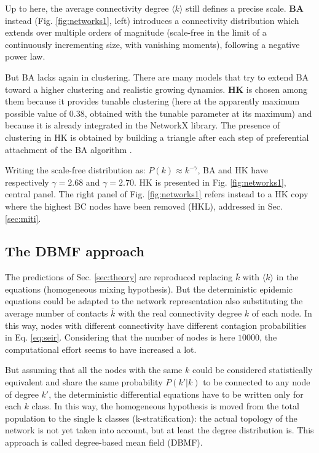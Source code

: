 \documentclass[DIV=12, BCOR=0pt]{scrartcl}  %
\begin{document}
  
  Up to here, the average connectivity degree $\langle k \rangle$ still defines a precise scale. \textbf{BA} instead (Fig. \ref{fig:networks1}, left) introduces a connectivity distribution which extends over multiple orders of magnitude (scale-free in the limit of a continuously incrementing size, with vanishing moments), following a negative power law.
  
  But BA lacks again in clustering. There are many models that try to extend BA toward a higher clustering and realistic growing dynamics. \textbf{HK} is chosen among them because it provides tunable clustering (here at the apparently maximum possible value of $0.38$, obtained with the tunable parameter at its maximum) and because it is already integrated in the NetworkX library. The presence of clustering in HK is obtained by building a triangle after each step of preferential attachment of the BA algorithm \citep{Holme}.
  
  Writing the scale-free distribution as: $P(k) \approx k^{- \gamma}$, BA and HK have respectively $\gamma = 2.68$ and $\gamma = 2.70$.
  HK is presented in Fig. \ref{fig:networks1}, central panel. 
  The right panel of Fig. \ref{fig:networks1} refers instead to a HK copy where the highest BC nodes have been removed (HKL), addressed in Sec. \ref{sec:miti}.
  
  
  \subsection{The DBMF approach} 
  The predictions of Sec. \ref{sec:theory} are reproduced replacing $\bar{k}$ with $\langle k \rangle$ in the equations (homogeneous mixing hypothesis). But the deterministic epidemic equations could be adapted to the network representation also substituting the average number of contacts $\bar{k}$ with the real connectivity degree $k$ of each node. In this way, nodes with different connectivity have different contagion probabilities in Eq. \ref{eq:seir}. Considering that the number of nodes is here $10000$, the computational effort seems to have increased a lot.
  
  But assuming that all the nodes with the same $k$ could be considered statistically equivalent and share the same probability $P(k'|k)$ to be connected to any node of degree $k'$, the deterministic differential equations have to be written only for each $k$ class.
  In this way, the homogeneous hypothesis is moved from the total population to the single k classes (k-stratification): the actual topology of the network is not yet taken into account, but at least the degree distribution is. This approach is called degree-based mean field (DBMF).
  
\end{document}
